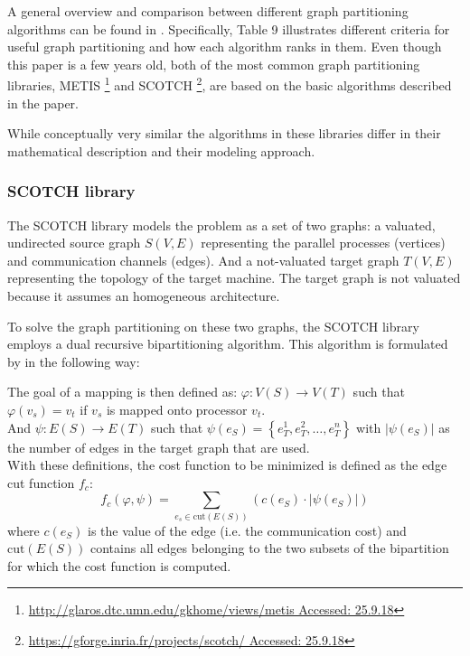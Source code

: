 A general overview and comparison between different graph partitioning algorithms can be found in \citet{karypis1998fast}.
Specifically, Table 9 illustrates different criteria for useful graph partitioning and how each algorithm ranks in them.
Even though this paper is a few years old, both of the most common graph partitioning libraries, METIS \footnote{\href{http://glaros.dtc.umn.edu/gkhome/views/metis}{http://glaros.dtc.umn.edu/gkhome/views/metis Accessed: 25.9.18}} and SCOTCH \footnote{\href{https://gforge.inria.fr/projects/scotch/}{https://gforge.inria.fr/projects/scotch/ Accessed: 25.9.18}}, are based on the basic algorithms described in the paper.

While conceptually very similar the algorithms in these libraries differ in their mathematical description and their modeling approach.

\subsubsection{SCOTCH library}
The SCOTCH library models the problem as a set of two graphs:
a valuated, undirected source graph $S(V, E)$ representing the parallel processes (vertices) and communication channels (edges). And a not-valuated target graph $T(V, E)$ representing the topology of the target machine.
The target graph is not valuated because it assumes an homogeneous architecture.

To solve the graph partitioning on these two graphs, the SCOTCH library employs a dual recursive bipartitioning algorithm.
This algorithm is formulated by \citet{pellegrini1994static} in the following way:

The goal of a mapping is then defined as:
$\varphi : V\left(S\right) \rightarrow V\left(T\right)$ such that $\varphi\left(v_s\right) = v_t $ if $v_s$ is mapped onto processor $v_t$.
\\
And $\psi : E\left(S\right) \rightarrow E\left(T\right)$ such that $\psi\left(e_S\right) = \left\{ e_T^1, e_T^2, \dots, e_T^n \right\}$ with $\left| \psi\left(e_S\right) \right|$ as the number of edges in the target graph that are used.
\\
With these definitions, the cost function to be minimized is defined as the edge cut function $f_c$:
\begin{equation}
f_c\left(\varphi, \psi \right) = \sum_{e_s \in \text{cut} \left(E\left(S\right)\right)} \left(c\left(e_S\right) \cdot \left| \psi\left(e_S\right) \right| \right)
\end{equation}
where $c\left(e_S\right)$ is the value of the edge (i.e. the communication cost) and $\text{cut} \left(E\left(S\right)\right)$ contains all edges belonging to the two subsets of the bipartition for which the cost function is computed.

